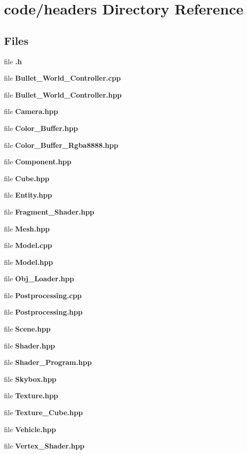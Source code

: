 \section{code/headers Directory Reference}
\label{dir_0738ad253578b95ec63fca032667c09c}
\subsection*{Files}
\begin{DoxyCompactItemize}
\item 
file \textbf{ .\+h}
\item 
file \textbf{ Bullet\+\_\+\+World\+\_\+\+Controller.\+cpp}
\item 
file \textbf{ Bullet\+\_\+\+World\+\_\+\+Controller.\+hpp}
\item 
file \textbf{ Camera.\+hpp}
\item 
file \textbf{ Color\+\_\+\+Buffer.\+hpp}
\item 
file \textbf{ Color\+\_\+\+Buffer\+\_\+\+Rgba8888.\+hpp}
\item 
file \textbf{ Component.\+hpp}
\item 
file \textbf{ Cube.\+hpp}
\item 
file \textbf{ Entity.\+hpp}
\item 
file \textbf{ Fragment\+\_\+\+Shader.\+hpp}
\item 
file \textbf{ Mesh.\+hpp}
\item 
file \textbf{ Model.\+cpp}
\item 
file \textbf{ Model.\+hpp}
\item 
file \textbf{ Obj\+\_\+\+Loader.\+hpp}
\item 
file \textbf{ Postprocessing.\+cpp}
\item 
file \textbf{ Postprocessing.\+hpp}
\item 
file \textbf{ Scene.\+hpp}
\item 
file \textbf{ Shader.\+hpp}
\item 
file \textbf{ Shader\+\_\+\+Program.\+hpp}
\item 
file \textbf{ Skybox.\+hpp}
\item 
file \textbf{ Texture.\+hpp}
\item 
file \textbf{ Texture\+\_\+\+Cube.\+hpp}
\item 
file \textbf{ Vehicle.\+hpp}
\item 
file \textbf{ Vertex\+\_\+\+Shader.\+hpp}
\end{DoxyCompactItemize}
